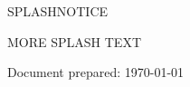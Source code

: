 \vspace{1cm}
\centerline{\LARGE SPLASHNOTICE }
\vspace{0.5cm}
\centerline{MORE SPLASH TEXT}
\vspace{3cm}
\centerline{Document prepared: \today}

